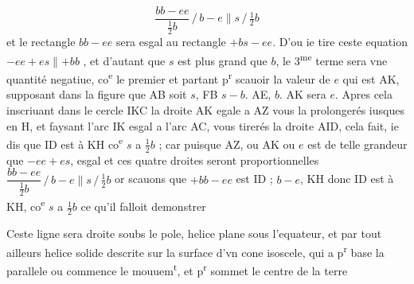 \documentclass[11pt,a4paper]{article}
\begin{document}
\[ \frac{bb - ee}{\frac{1}{2}b} \,/\, b - e \parallel s \,/\, \tfrac{1}{2}b \]
et le rectangle $bb - ee$ sera esgal au rectangle $+bs - ee$. D'ou ie tire ceste equation $-ee + es \parallel +bb$ , et d'autant que $s$ est plus grand que $b$, le 3\textsuperscript{me} terme sera vne quantité negatiue, co\textsuperscript{e} le premier et partant p\textsuperscript{r} scauoir la valeur \struck{\ill{}} de $e$ qui est AK, supposant dans la figure que AB soit $s$, FB $s - b$. AE, $b$. AK sera $e$. Apres cela inscriuant dans le cercle IKC la droite AK egale a AZ vous la prolongerés iusques en H, et faysant l'arc IK esgal a l'arc AC, vous tirerés la droite AID, cela fait, ie dis que ID est à KH co\textsuperscript{e} $s$ a $\frac{1}{2}b$ ; car puisque AZ, ou AK ou $e$ est de telle grandeur que $-ee + es$,  esgal  et ces quatre droites seront proportionnelles $\dfrac{bb - ee}{\frac{1}{2}b} \,/\, b - e \parallel s \,/\, \frac{1}{2}b$ or scauons que $+bb - ee$ est ID ; $b - e$, KH donc ID est à KH, co\textsuperscript{e} $s$ a $\frac{1}{2}b$ ce qu'il falloit demonstrer

Ceste ligne sera droite soubs le pole, helice plane sous l'equateur, et par tout ailleurs helice solide descrite sur la surface d'vn cone isoscele, qui a p\textsuperscript{r} base la parallele ou commence le mouuem\textsuperscript{t}, et p\textsuperscript{r} sommet le centre de la terre

\end{document}
